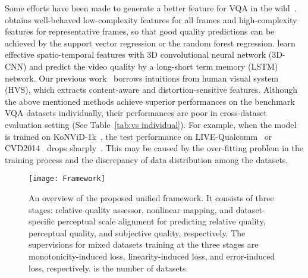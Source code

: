 \documentclass[twocolumn]{svjour3}          \smartqed  \usepackage{graphicx}
\begin{document}
Some efforts have been made to generate a better feature for VQA in the wild~\citep{you2019deep,korhonen2019two,li2019quality}. 
\citet{korhonen2019two} obtains well-behaved low-complexity features for all frames and high-complexity features for representative frames, so that good quality predictions can be achieved by the support vector regression or the random forest regression.
\citet{you2019deep} learn effective spatio-temporal features with 3D convolutional neural network (3D-CNN) and predict the video quality by a long-short term memory (LSTM) network.
Our previous work~\citep{li2019quality} borrows intuitions from human visual system (HVS), which extracts content-aware and distortion-sensitive features.
Although the above mentioned methods achieve superior performances on the benchmark VQA datasets individually, their performances are poor in cross-dataset evaluation setting (See Table~\ref{tab:vs individual}).  
For example, when the model is trained on KoNViD-1k~\citep{hosu2017konstanz}, the test performance on LIVE-Qualcomm~\citep{ghadiyaram2018capture}  or CVD2014~\citep{nuutinen2016cvd2014} drops sharply~\citep{korhonen2019two}.  
This may be caused by the over-fitting problem in the training process and the discrepancy of data distribution among the datasets.

\begin{figure*}[!htb]
\begin{center}
  \texttt{[image: Framework]}\end{center}
  \caption{An overview of the proposed unified framework. It consists of three stages: relative quality assessor, nonlinear mapping, and dataset-specific perceptual scale alignment for predicting relative quality, perceptual quality, and subjective quality, respectively. The supervisions for mixed datasets training at the three stages are monotonicity-induced loss, linearity-induced loss, and error-induced loss, respectively.  is the number of datasets.} 
  \label{fig:framework}
\end{figure*}
\end{document}
